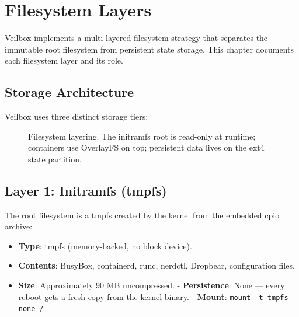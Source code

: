 \chapter{Filesystem Layers}
\label{ch:fslayers}

Veilbox implements a multi-layered filesystem strategy that separates
the immutable root filesystem from persistent state storage. This chapter
documents each filesystem layer and its role.

\section{Storage Architecture}

Veilbox uses three distinct storage tiers:

\begin{figure}[H]
\centering
{}
\caption{Filesystem layering. The initramfs root is read-only at runtime;
containers use OverlayFS on top; persistent data lives on the ext4
state partition.}
\label{fig:fslayers}
\end{figure}

\section{Layer 1: Initramfs (tmpfs)}

The root filesystem is a tmpfs created by the kernel from the embedded
cpio archive:

\begin{itemize}[nosep]
  \item \textbf{Type}: tmpfs (memory-backed, no block device).
  \item \textbf{Contents}: BusyBox, containerd, runc, nerdctl, Dropbear,
        configuration files.
  \item \textbf{Size}: Approximately 90 MB uncompressed.
  - \textbf{Persistence}: None — every reboot gets a fresh copy from the
        kernel binary.
  - \textbf{Mount}: \texttt{mount -t tmpfs none /}
\end{itemize}

